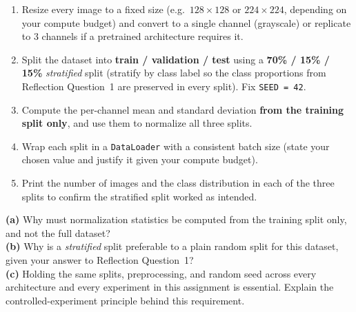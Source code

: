 \documentclass[12pt,a4paper]{article}
\begin{document}
\begin{stepbox}
\begin{enumerate}[leftmargin=*, label=\arabic*.]
  \item Resize every image to a fixed size (e.g.\ $128 \times 128$ or $224 \times 224$,
        depending on your compute budget) and convert to a single channel (grayscale)
        or replicate to 3 channels if a pretrained architecture requires it.
  \item Split the dataset into \textbf{train / validation / test} using a
        \textbf{70\% / 15\% / 15\%} \emph{stratified} split (stratify by class label so
        the class proportions from Reflection Question~1 are preserved in every split).
        Fix \texttt{SEED = 42}.
  \item Compute the per-channel mean and standard deviation \textbf{from the training
        split only}, and use them to normalize all three splits.
  \item Wrap each split in a \texttt{DataLoader} with a consistent batch size
        (state your chosen value and justify it given your compute budget).
  \item Print the number of images and the class distribution in each of the three
        splits to confirm the stratified split worked as intended.
\end{enumerate}
\end{stepbox}

\begin{tcolorbox}[colback=lightblue!40, colframe=myColorB, title={\textbf{2.1 --- Questions}}, fonttitle=\small\bfseries, breakable]
\textbf{(a)} Why must normalization statistics be computed from the training split
only, and not the full dataset? \\[6pt]
\textbf{(b)} Why is a \emph{stratified} split preferable to a plain random split for
this dataset, given your answer to Reflection Question~1? \\[6pt]
\textbf{(c)} Holding the same splits, preprocessing, and random seed across every
architecture and every experiment in this assignment is essential. Explain the
controlled-experiment principle behind this requirement.
\end{tcolorbox}
\end{document}
